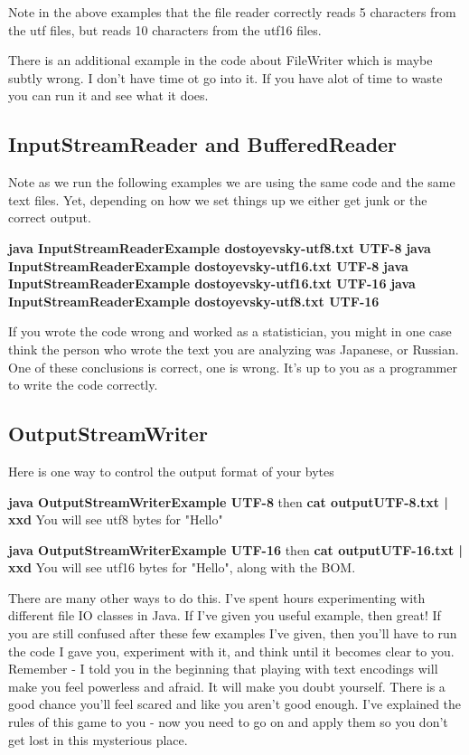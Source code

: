 \documentclass[12pt]{article}
\begin{document}
Note in the above examples that the file reader correctly reads 5 characters from the utf files, but reads 10 characters from the utf16 files.

There is an additional example in the code about FileWriter which is maybe subtly wrong. I don't have time ot go into it. If you have alot of time to waste you can run it and see what it does. 

\subsection{InputStreamReader and BufferedReader}

Note as we run the following examples we are using the same code and the same text files. Yet, depending on how we set things up we either get junk or the correct output.

\begin{center}
\textbf{java InputStreamReaderExample dostoyevsky-utf8.txt UTF-8}
\textbf{java InputStreamReaderExample dostoyevsky-utf16.txt UTF-8}
\textbf{java InputStreamReaderExample dostoyevsky-utf16.txt UTF-16}
\textbf{java InputStreamReaderExample dostoyevsky-utf8.txt UTF-16}
\end{center}

If you wrote the code wrong and worked as a statistician, you might in one case think the person who wrote the text you are analyzing was Japanese, or Russian. One of these conclusions is correct, one is wrong. It's up to you as a programmer to write the code correctly.

\subsection{OutputStreamWriter}
Here is one way to control the output format of your bytes

\begin{center}
\textbf{java OutputStreamWriterExample UTF-8}
then
\textbf{cat outputUTF-8.txt | xxd}
You will see utf8 bytes for "Hello"
\end{center}

\begin{center}
\textbf{java OutputStreamWriterExample UTF-16}
then
\textbf{cat outputUTF-16.txt | xxd}
You will see utf16 bytes for "Hello", along with the BOM.
\end{center}

There are many other ways to do this. I've spent hours experimenting with different file IO classes in Java. If I've given you useful example, then great! If you are still confused after these few examples I've given, then you'll have to run the code I gave you, experiment with it, and think until it becomes clear to you. Remember -  I told you in the beginning that playing with text encodings will make you feel powerless and afraid. It will make you doubt yourself. There is a good chance you'll feel scared and like you aren't good enough. I've explained the rules of this game to you - now you need to go on and apply them so you don't get lost in this mysterious place.
\end{document}
